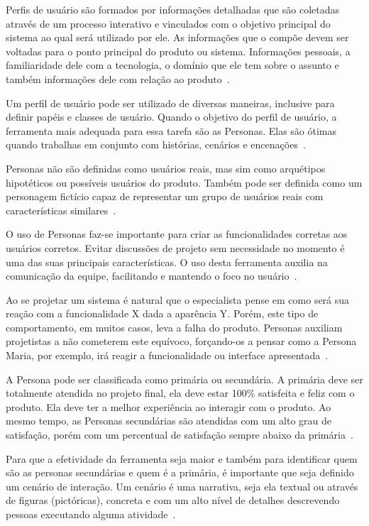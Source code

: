 Perfis de usuário são formados por informações detalhadas que são coletadas através de um processo interativo e vinculados com o objetivo principal do sistema ao qual será utilizado por ele. As informações que o compõe devem ser voltadas para o ponto principal do produto ou sistema. Informações pessoais, a familiaridade dele com a tecnologia, o domínio que ele tem sobre o assunto e também informações dele com relação ao produto~\cite{barbosa:2010}.

Um perfil de usuário pode ser utilizado de diversas maneiras, inclusive para definir papéis e classes de usuário. Quando o objetivo do perfil de usuário, a ferramenta mais adequada para essa tarefa são as Personas. Elas são ótimas quando trabalhas em conjunto com histórias, cenários e encenações~\cite{hartson:2012}.

Personas não são definidas como usuários reais, mas sim como arquétipos hipotéticos ou possíveis usuários do produto. Também pode ser definida como um personagem fictício capaz de representar um grupo de usuários reais com características similares~\cite{aquino:2005, barbosa:2010, hartson:2012, masiero:2013}.

O uso de Personas faz-se importante para criar as funcionalidades corretas aos usuários corretos. Evitar discussões de projeto sem necessidade no momento é uma das suas principais características. O uso desta ferramenta auxilia na comunicação da equipe, facilitando e mantendo o foco no usuário~\cite{aquino:2005, hartson:2012, masiero:2013}.

Ao se projetar um sistema é natural que o especialista pense em como será sua reação com a funcionalidade X dada a aparência Y. Porém, este tipo de comportamento, em muitos casos, leva a falha do produto. Personas auxiliam projetistas a não cometerem este equívoco, forçando-os a pensar como a Persona Maria, por exemplo, irá reagir a funcionalidade ou interface apresentada~\cite{hartson:2012}.

A Persona pode ser classificada como primária ou secundária. A primária deve ser totalmente atendida no projeto final, ela deve estar 100\% satisfeita e feliz com o produto. Ela deve ter a melhor experiência ao interagir com o produto. Ao mesmo tempo, as Personas secundárias são atendidas com um alto grau de satisfação, porém com um percentual de satisfação sempre abaixo da primária~\cite{hartson:2012}.

Para que a efetividade da ferramenta seja maior e também para identificar quem são as personas secundárias e quem é a primária, é importante que seja definido um cenário de interação. Um cenário é uma narrativa, seja ela textual ou através de figuras (pictóricas), concreta e com um alto nível de detalhes descrevendo pessoas executando alguma atividade~\cite{barbosa:2010}.


